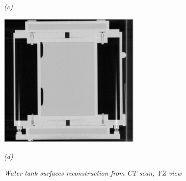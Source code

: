 \begin{figure}[htb]
\begin{minipage}[b]{2.75in}
    \centerline{\emph{(c)}}
  \end{minipage}\medskip
  \begin{minipage}[b]{2.75in}
    \centering
    \centerline{\mbox{\includegraphics[width=2.75in]{data_extraction/images/surface_plane/saggital_ct_tilt.eps}}}
    \centerline{\emph{(d)}}
  \end{minipage}
  
  \caption{\emph{Water tank surfaces reconstruction from CT scan, YZ view}}
  \label{fig:ct_tank_surface_reconstruction_yz}

\end{figure}

